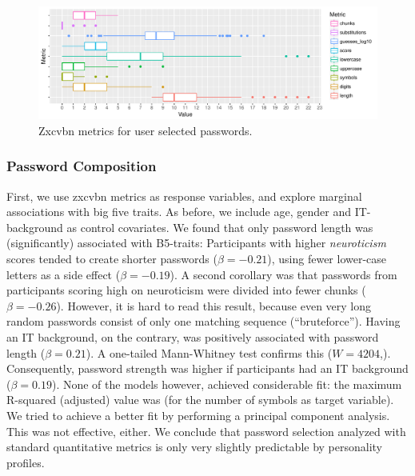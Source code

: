 \begin{figure}[tbph]
	\centering
	\includegraphics[width=1\linewidth]{figures/personality/study3-metrics-overview}
	\caption{\label{fig:personality:study3:metrics-overview} Zxcvbn metrics for user selected passwords.}
\end{figure}

\subsubsection{Password Composition}
First, we use zxcvbn metrics as response variables, and explore marginal associations with big five traits. As before, we include age, gender and IT-background as control covariates. We found that only password length was (significantly) associated with B5-traits: Participants with higher \textit{neuroticism} scores tended to create shorter passwords ($\beta = -0.21$), using fewer lower-case letters as a side effect ($\beta = -0.19$). A second corollary was that passwords from participants scoring high on neuroticism were divided into fewer chunks ($\beta=-0.26$). However, it is hard to read this result, because even very long random passwords consist of only one matching sequence (``bruteforce''). 
Having an IT background, on the contrary, was positively associated with password length ($\beta = 0.21$). A one-tailed Mann-Whitney test confirms this ($W=4204$,). Consequently, password strength was higher if participants had an IT background ($\beta=0.19$). None of the models however, achieved considerable fit: the maximum R-squared (adjusted) value was  (for the number of symbols as target variable). We tried to achieve a better fit by performing a principal component analysis. This was not effective, either. We conclude that password selection analyzed with standard quantitative metrics is only very slightly predictable by personality profiles. 

